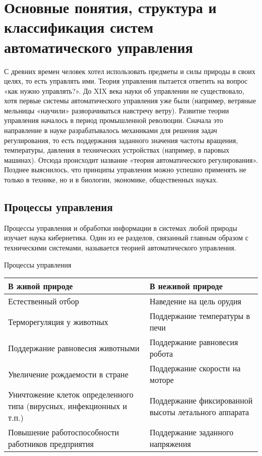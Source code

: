 \documentclass[TAU.tex]{subfiles}
\begin{document}
\chapter{Основные понятия, структура и классификация систем автоматического управления}

 С древних времен человек хотел использовать предметы и силы природы в своих целях, то есть управлять ими. Теория управления пытается ответить на вопрос «как нужно управлять?». До XIX века науки об управлении не существовало, хотя первые системы автоматического управления уже были (например, ветряные мельницы «научили» разворачиваться навстречу ветру). Развитие теории управления началось в период промышленной революции. Сначала это направление в науке разрабатывалось механиками для решения задач регулирования, то есть поддержания заданного значения частоты вращения, температуры, давления в технических устройствах (например, в паровых машинах). Отсюда происходит название «теория автоматического регулирования». Позднее выяснилось, что принципы управления можно успешно применять не только в технике, но и в биологии, экономике, общественных науках.

\section {Процессы управления}

Процессы управления и обработки информации в системах любой природы изучает наука кибернетика. Один из ее разделов, связанный главным образом с техническими системами, называется теорией автоматического управления. 

\begin{center}
Процессы управления\\ [4pt]
\begin{tabular}{|p{6.5cm}|p{6.5cm}|}
  \hline
  {\Large В живой природе} & {\Large В неживой природе} \\ [4pt]
  \hline
  Естественный отбор & Наведение на цель орудия \\
  \hline
  Терморегуляция у животных & Поддержание температуры в печи\\
  \hline
  Поддержание равновесия животными & Поддержание равновесия робота\\
  \hline
  Увеличение рождаемости в стране & Поддержание скорости на моторе\\
  \hline
  Уничтожение клеток определенного типа (вирусных, инфекционных и т.п.)& Поддержание фиксированной высоты летального аппарата\\
  \hline
  Повышение работоспособности работников предприятия & Поддержание заданного напряжения\\
  \hline
\end{tabular}
\end{center}
\end{document}
